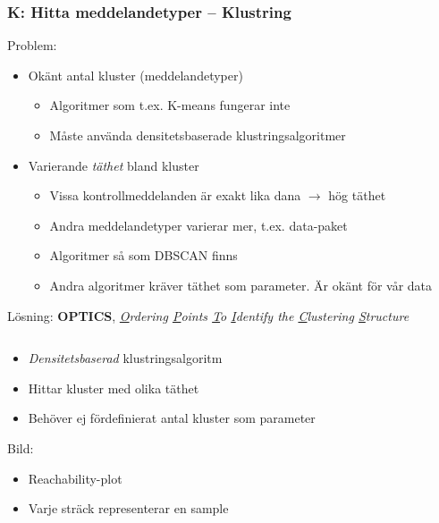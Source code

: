 \documentclass[xetex, 8pt]{beamer}
\begin{document}
    \begin{frame}
        \frametitle{K: Hitta meddelandetyper -- Klustring}
        Problem:
        \begin{itemize}
            \item Okänt antal kluster (meddelandetyper)
                \begin{itemize}
                    \item Algoritmer som t.ex. K-means fungerar inte
                    \item Måste använda densitetsbaserade klustringsalgoritmer
                \end{itemize}
            \item Varierande \emph{täthet} bland kluster
                \begin{itemize}
                    \item Vissa kontrollmeddelanden är exakt lika dana $\rightarrow$ hög täthet
                    \item Andra meddelandetyper varierar mer, t.ex. data-paket
                    \item Algoritmer så som DBSCAN finns
                    \item Andra algoritmer kräver täthet som parameter. Är okänt
                        för vår data
                \end{itemize}
        \end{itemize}
        Lösning: \textbf{OPTICS}, \scriptsize{
            \emph{\underline{O}rdering \underline{P}oints \underline{T}o
                  \underline{I}dentify the \underline{C}lustering 
                  \underline{S}tructure}}
        \vskip20pt
        \begin{columns}[t]
            \begin{column}[T]{6cm}
                \begin{itemize}
                    \item \emph{Densitetsbaserad} klustringsalgoritm
                    \item Hittar kluster med olika täthet
                    \item Behöver ej fördefinierat antal kluster som parameter
                \end{itemize}
                Bild:
                \begin{itemize}
                    \item Reachability-plot
                    \item Varje sträck representerar en sample

\end{itemize}
\end{column}
\end{columns}
\end{frame}
\end{document}

